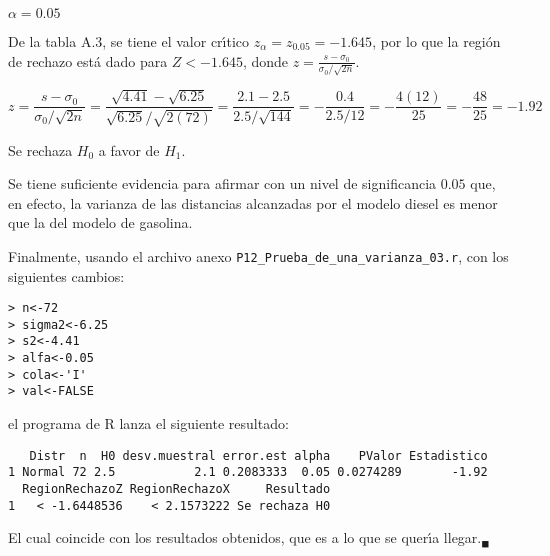 \begin{solucion}
\begin{enumerate}
  \begin{significancia}
   $\alpha = 0.05$
  \end{significancia}

  \begin{region}
   De la tabla A.3, se tiene el valor cr\'{\i}tico
   $z_{\alpha} = z_{0.05} = -1.645$,
   por lo que la regi\'on de rechazo est\'a dado para $Z < -1.645$,
   donde $z = \frac{s-\sigma_0}{\sigma_0/\sqrt{2n}}$.
  \end{region}

  \begin{estadistico}
   \begin{equation*}
    z = \frac{s-\sigma_0}{\sigma_0/\sqrt{2n}}
    = \frac{\sqrt{4.41} - \sqrt{6.25}}{\sqrt{6.25}/\sqrt{2(72)}}
    = \frac{2.1 - 2.5}{2.5/\sqrt{144}} 
    = - \frac{0.4}{2.5/12}
    = - \frac{4(12)}{25}
    = - \frac{48}{25} = -1.92
   \end{equation*}
  \end{estadistico}

  \begin{decision}
   Se rechaza $H_0$ a favor de $H_1$.
  \end{decision}

  \begin{conclusion}
   Se tiene suficiente evidencia para afirmar
   con un nivel de significancia $0.05$
   que, en efecto, la varianza de las distancias alcanzadas por el modelo diesel
   es menor que la del modelo de gasolina.
  \end{conclusion}

  Finalmente, usando el archivo anexo
  \texttt{P12\_Prueba\_de\_una\_varianza\_03.r},
  con los siguientes cambios:
  \begin{verbatim}
> n<-72
> sigma2<-6.25
> s2<-4.41
> alfa<-0.05
> cola<-'I'
> val<-FALSE
  \end{verbatim}
  \vspace{-0.5cm}
  el programa de R lanza el siguiente resultado:
  \begin{verbatim}
   Distr  n  H0 desv.muestral error.est alpha    PValor Estadistico
1 Normal 72 2.5           2.1 0.2083333  0.05 0.0274289       -1.92
  RegionRechazoZ RegionRechazoX     Resultado
1   < -1.6448536    < 2.1573222 Se rechaza H0
  \end{verbatim}
  \vspace{-0.5cm}
  El cual coincide con los resultados obtenidos,
  que es a lo que se quer\'{\i}a llegar.${}_{\blacksquare}$
 \end{enumerate}
\end{solucion}
